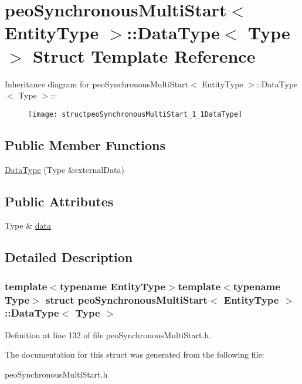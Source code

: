 \hypertarget{structpeoSynchronousMultiStart_1_1DataType}{
\section{peo\-Synchronous\-Multi\-Start$<$ Entity\-Type $>$::Data\-Type$<$ Type $>$ Struct Template Reference}
\label{structpeoSynchronousMultiStart_1_1DataType}
}
Inheritance diagram for peo\-Synchronous\-Multi\-Start$<$ Entity\-Type $>$::Data\-Type$<$ Type $>$::\begin{figure}[H]
\begin{center}
\leavevmode
\texttt{[image: structpeoSynchronousMultiStart\_1\_1DataType]}
\end{center}
\end{figure}
\subsection*{Public Member Functions}
\begin{CompactItemize}
\item 
\hypertarget{structpeoSynchronousMultiStart_1_1DataType_cf5b9add5416139738e152b461008a89}{
\hyperlink{structpeoSynchronousMultiStart_1_1DataType_cf5b9add5416139738e152b461008a89}{Data\-Type} (Type \&external\-Data)}
\label{structpeoSynchronousMultiStart_1_1DataType_cf5b9add5416139738e152b461008a89}

\end{CompactItemize}
\subsection*{Public Attributes}
\begin{CompactItemize}
\item 
\hypertarget{structpeoSynchronousMultiStart_1_1DataType_76abc322ae058a820b2c964907bc0d80}{
Type \& \hyperlink{structpeoSynchronousMultiStart_1_1DataType_76abc322ae058a820b2c964907bc0d80}{data}}
\label{structpeoSynchronousMultiStart_1_1DataType_76abc322ae058a820b2c964907bc0d80}

\end{CompactItemize}


\subsection{Detailed Description}
\subsubsection*{template$<$typename Entity\-Type$>$template$<$typename Type$>$ struct peo\-Synchronous\-Multi\-Start$<$ Entity\-Type $>$::Data\-Type$<$ Type $>$}





Definition at line 132 of file peo\-Synchronous\-Multi\-Start.h.

The documentation for this struct was generated from the following file:\begin{CompactItemize}
\item 
peo\-Synchronous\-Multi\-Start.h\end{CompactItemize}
